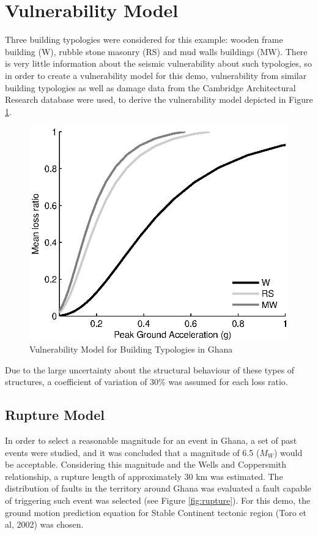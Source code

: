 \section{Vulnerability Model}

Three building typologies were considered for this example: wooden 
frame building (W), rubble stone masonry (RS) and mud walls buildings 
(MW). There is very little information about the seismic vulnerability 
about such typologies, so in order to create a vulnerability model for
this demo, vulnerability from similar building typologies as well as 
damage data from the Cambridge Architectural Research database were 
used, to derive the vulnerability model depicted in Figure 
\ref{fig:vulnerability}. 

\begin{figure}[htb]
	\centering
		\includegraphics{./figures/vulnerability.eps}
	\caption{Vulnerability Model for Building Typologies in Ghana}
	\label{fig:vulnerability}
\end{figure}

Due to the large uncertainty about the structural behaviour of these
types of structures, a coefficient of variation of 30\% was assumed 
for each loss ratio.

\subsection{Rupture Model}

In order to select a reasonable magnitude for an event in Ghana, 
a set of past events were studied, and it was concluded that a
magnitude of 6.5 ($M_W$) would be acceptable. Considering this
magnitude and the Wells and Coppersmith relationship, a rupture
length of approximately 30 km was estimated. The distribution of 
faults in the territory around Ghana was evaluated a fault capable
of triggering such event was selected (see Figure \ref{fig:rupture}). 
For this demo, the ground motion prediction equation for Stable 
Continent tectonic region (Toro et al, 2002) was chosen. 


